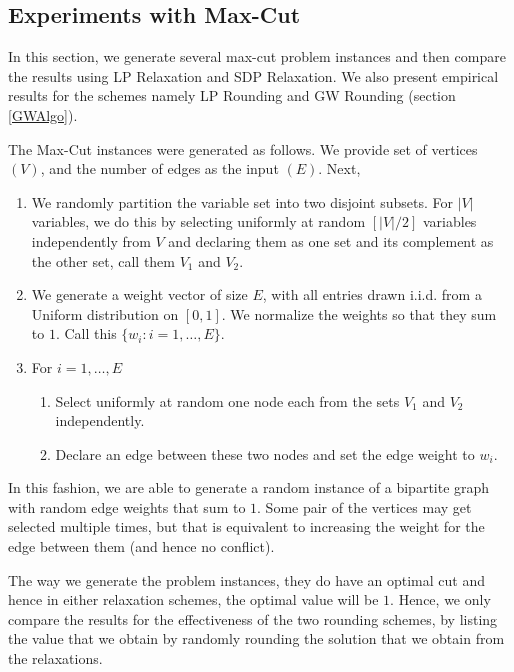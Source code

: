 \subsection{Experiments with Max-Cut}
In this section, we generate several max-cut problem instances and then compare the results using LP Relaxation and SDP Relaxation. We also present empirical results for the schemes namely LP Rounding and GW Rounding (section \ref{GWAlgo}). 

The Max-Cut instances were generated as follows. We provide set of vertices $(V)$, and the number of edges as the input $(E)$. Next, 
\begin{enumerate}
	\item We randomly partition the variable set into two disjoint subsets. For $|V|$ variables, we do this by selecting uniformly at random $[|V|/2]$ variables independently from $V$ and declaring them as one set and its complement as the other set, call them $V_1$ and $V_2$. 
	\item We generate a weight vector of size $E$, with all entries drawn i.i.d. from a Uniform distribution on $[0, 1]$. We normalize the weights so that they sum to $1$. Call this $\{ w_i : i = 1, \ldots, E\}$.
	\item For $i=1, \ldots, E$ 
	\begin{enumerate}
		\item  Select uniformly at random one node each from the sets $V_1$ and $V_2$ independently. 
		\item Declare an edge between these two nodes and set the edge weight to $w_{i}$.
	\end{enumerate}
\end{enumerate}
In this fashion, we are able to generate a random instance of a bipartite graph with random edge weights that sum to $1$. Some pair of the vertices may get selected multiple times, but that is equivalent to increasing the weight for the edge between them (and hence no conflict).

The way we generate the problem instances, they do have an optimal cut and hence in either relaxation schemes, the optimal value will be $1$. Hence, we only compare the results for the effectiveness of the two rounding schemes, by listing the value that we obtain by randomly rounding the solution that we obtain from the relaxations. 



